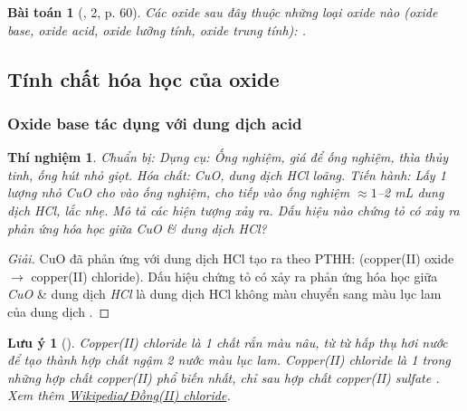 \documentclass{article}
\newtheorem{baitoan}{Bài toán}
\newtheorem{luuy}{Lưu ý}
\newtheorem{thinghiem}{Thí nghiệm}
\begin{document}
\begin{baitoan}[\cite{SGK_KHTN_8_Canh_Dieu}, 2, p. 60]
	Các oxide sau đây thuộc những loại oxide nào (oxide base, oxide acid, oxide lưỡng tính, oxide trung tính): \emph{}.
\end{baitoan}

\subsection{Tính chất hóa học của oxide}

\subsubsection{Oxide base tác dụng với dung dịch acid}

\begin{thinghiem}
	\emph{Chuẩn bị:} Dụng cụ: Ống nghiệm, giá để ống nghiệm, thìa thủy tinh, ống hút nhỏ giọt. Hóa chất: \emph{CuO}, dung dịch \emph{HCl} loãng. \emph{Tiến hành:} Lấy 1 lượng nhỏ \emph{CuO} cho vào ống nghiệm, cho tiếp vào ống nghiệm $\approx1$\emph{--2 mL} dung dịch \emph{HCl}, lắc nhẹ. Mô tả các hiện tượng xảy ra. Dấu hiệu nào chứng tỏ có xảy ra phản ứng hóa học giữa \emph{CuO} \& dung dịch \emph{HCl}?
\end{thinghiem}

\begin{proof}[Giải]
	CuO đã phản ứng với dung dịch HCl tạo ra  theo PTHH:  (copper(II) oxide $\to$ copper(II) chloride). Dấu hiệu chứng tỏ có xảy ra phản ứng hóa học giữa \emph{CuO} \& dung dịch \emph{HCl} là dung dịch HCl không màu chuyển sang màu lục lam của dung dịch .
\end{proof}

\begin{luuy}[]
	Copper(II) chloride \emph{} là 1 chất rắn màu nâu, từ từ hấp thụ hơi nước để tạo thành hợp chất ngậm 2 nước màu lục lam. Copper(II) chloride là 1 trong những hợp chất copper(II) phổ biến nhất, chỉ sau hợp chất copper(II) sulfate \emph{}. Xem thêm \href{https://vi.wikipedia.org/wiki/%C4%90%E1%BB%93ng(II)_chloride}{Wikipedia\emph{\texttt{/}}Đồng(II) chloride}.
\end{luuy}
\end{document}
